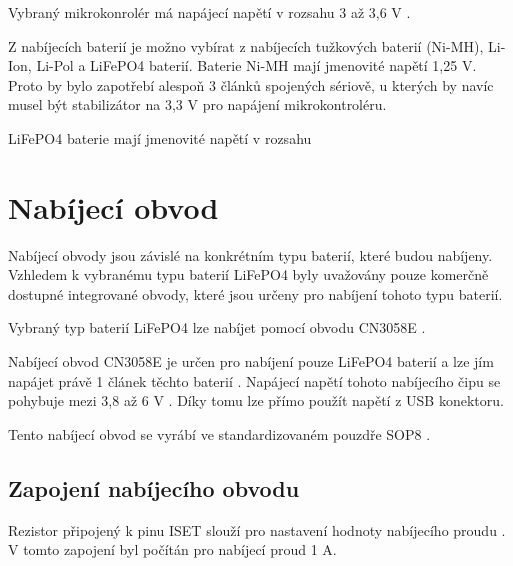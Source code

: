 
Vybraný mikrokonrolér má napájecí napětí v rozsahu 3 až 3,6 V \cite{ESP_C3_dtsh}. 

Z nabíjecích baterií je možno vybírat z nabíjecích tužkových baterií (Ni-MH), Li-Ion, Li-Pol a LiFePO4 baterií.
Baterie Ni-MH mají jmenovité napětí 1,25 V. %
Proto by bylo zapotřebí alespoň 3 článků spojených sériově, u kterých by navíc musel být stabilizátor
na 3,3 V pro napájení mikrokontroléru. %


LiFePO4 baterie mají jmenovité napětí v rozsahu %



\section{Nabíjecí obvod}
Nabíjecí obvody jsou závislé na konkrétním typu baterií, které budou nabíjeny. Vzhledem k vybranému typu baterií LiFePO4 byly uvažovány pouze komerčně
dostupné integrované obvody, které jsou určeny pro nabíjení tohoto typu baterií. 

Vybraný typ baterií LiFePO4 lze nabíjet pomocí obvodu CN3058E \cite{charger_dtsh}. 


Nabíjecí obvod CN3058E je určen pro nabíjení pouze LiFePO4 baterií a lze jím napájet právě 1 článek těchto baterií \cite{charger_dtsh}. Napájecí napětí tohoto 
nabíjecího čipu se pohybuje mezi 3,8 až 6 V \cite{charger_dtsh}. Díky tomu lze přímo použít napětí z USB konektoru. 



Tento nabíjecí obvod se vyrábí ve standardizovaném pouzdře SOP8 \cite{charger_dtsh}.

\subsection{Zapojení nabíjecího obvodu}
Rezistor připojený k pinu ISET slouží pro nastavení hodnoty nabíjecího proudu \cite{charger_dtsh}. V tomto zapojení byl počítán pro nabíjecí proud 1 A. 

